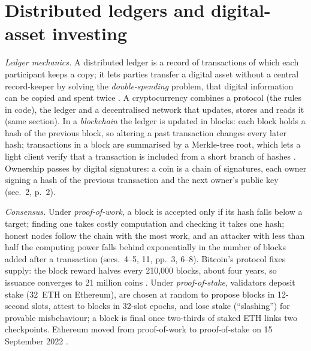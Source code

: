 \section{Distributed ledgers and digital-asset investing}

\begin{qfdefinition}\label{def:distributed-ledger-applications}
 \emph{Ledger mechanics.} A distributed ledger is a record of transactions of which each participant keeps a copy; it lets parties transfer a digital asset without a central record-keeper by solving the \emph{double-spending} problem, that digital information can be copied and spent twice \citep[ch.~V, ``Distributed ledger technology in cryptocurrencies'']{bis-aer-2018-cryptocurrencies}. A cryptocurrency combines a protocol (the rules in code), the ledger and a decentralised network that updates, stores and reads it (same section). In a \emph{blockchain} the ledger is updated in blocks: each block holds a hash of the previous block, so altering a past transaction changes every later hash; transactions in a block are summarised by a Merkle-tree root, which lets a light client verify that a transaction is included from a short branch of hashes \citep[secs.~3, 7--8, pp.~2--5]{s6-bitcoin}. Ownership passes by digital signatures: a coin is a chain of signatures, each owner signing a hash of the previous transaction and the next owner's public key (sec.~2, p.~2).

\emph{Consensus.} Under \emph{proof-of-work}, a block is accepted only if its hash falls below a target; finding one takes costly computation and checking it takes one hash; honest nodes follow the chain with the most work, and an attacker with less than half the computing power falls behind exponentially in the number of blocks added after a transaction (secs.~4--5, 11, pp.~3, 6--8). Bitcoin's protocol fixes supply: the block reward halves every 210{,}000 blocks, about four years, so issuance converges to 21 million coins \citep[draft of 9 February 2016, p.~62]{crypto-narayanan}. Under \emph{proof-of-stake}, validators deposit stake (32~ETH on Ethereum), are chosen at random to propose blocks in 12-second slots, attest to blocks in 32-slot epochs, and lose stake (``slashing'') for provable misbehaviour; a block is final once two-thirds of staked ETH links two checkpoints. Ethereum moved from proof-of-work to proof-of-stake on 15 September 2022 \citep[``Proof-of-stake'' and ``The Merge'' pages]{ethereum-pos-2026}.


\end{qfdefinition}
